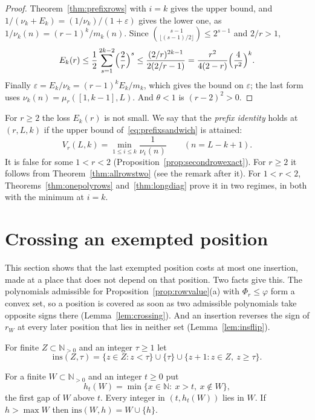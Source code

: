 \documentclass[11pt]{article}
\newcommand{\N}{\mathbb N}
\begin{document}
\begin{proof}
Theorem~\ref{thm:prefixrows} with $i=k$ gives the upper bound, and
$1/(\nu_k+E_k)=(1/\nu_k)/(1+\varepsilon)$ gives the lower one, as
$1/\nu_k(n)=(r-1)^k/m_k(n)$.  Since
$\binom{s-1}{\lfloor(s-1)/2\rfloor}\le2^{s-1}$ and $2/r>1$,
\[
  E_k(r)\le\frac12\sum_{s=1}^{2k-2}\Bigl(\frac2r\Bigr)^s\le
  \frac{(2/r)^{2k-1}}{2(2/r-1)}=\frac{r^2}{4(2-r)}\Bigl(\frac4{r^2}\Bigr)^k .
\]
Finally $\varepsilon=E_k/\nu_k=(r-1)^kE_k/m_k$, which gives the bound on
$\varepsilon$; the last form uses $\nu_k(n)=\mu_r([1,k-1],L)$.  And
$\theta<1$ is $(r-2)^2>0$.
\end{proof}

For $r\ge2$ the loss $E_k(r)$ is not small.  We say that the
\emph{prefix identity} holds at $(r,L,k)$ if the upper bound
of~\eqref{eq:prefixsandwich} is attained:
\begin{equation}\label{eq:prefixid}
  V_r(L,k)=\min_{1\le i\le k}\frac1{\nu_i(n)}\qquad(n=L-k+1).
\end{equation}
It is false for some $1<r<2$ (Proposition~\ref{prop:secondrowexact}).
For $r\ge2$ it follows from Theorem~\ref{thm:allrowstwo} (see the remark
after it).  For $1<r<2$, Theorems~\ref{thm:onepolyrows}
and~\ref{thm:longdiag} prove it in two regimes, in both with the minimum at
$i=k$.

\section{Crossing an exempted position}\label{sec:crossing}

This section shows that the last exempted position costs at most one
insertion, made at a place that does not depend on that position.  Two
facts give this.  The polynomials admissible for
Proposition~\ref{prop:rowvalue}(a) with $\Phi_r\le\varphi$ form a convex set,
so a position is covered as soon as two admissible polynomials take opposite
signs there (Lemma~\ref{lem:crossing}).  And an insertion reverses the sign
of $r_W$ at every later position that lies in neither set
(Lemma~\ref{lem:insflip}).

For finite $Z\subset\N_{>0}$ and an integer $\tau\ge1$ let
\[
  \mathrm{ins}(Z,\tau)=\{z\in Z:z<\tau\}\cup\{\tau\}\cup\{z+1:z\in Z,\ z\ge\tau\}.
\]

For a finite $W\subset\N_{>0}$ and an integer $t\ge0$ put
\[
  h_t(W)=\min\{x\in\N:\ x>t,\ x\notin W\},
\]
the first gap of $W$ above $t$.  Every integer in $(t,h_t(W))$ lies in $W$.
If $h>\max W$ then $\mathrm{ins}(W,h)=W\cup\{h\}$.
\end{document}
